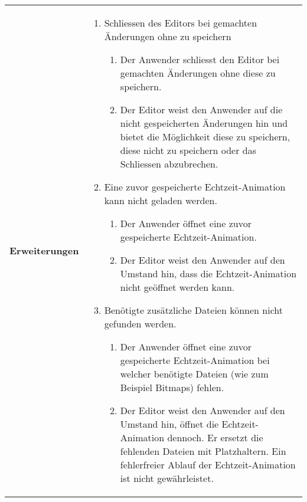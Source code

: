 \begin{longtabu}{p{0.5\textwidth}p{0.5\textwidth}}
    \cmidrule(r){1-1}\cmidrule(lr){2-2}
        \textbf{Erweiterungen} &
        \begin{enumerate}[label= (\alph*)]
            \item{Schliessen des Editors bei gemachten Änderungen ohne zu
                    speichern
                \begin{enumerate}[label= (\roman*)]
                    \item{Der Anwender schliesst den Editor bei gemachten
                            Änderungen ohne diese zu speichern.}
                    \item{Der Editor weist den Anwender auf die
                            nicht gespeicherten Änderungen hin und bietet
                            die Möglichkeit diese zu speichern, diese nicht
                            zu speichern oder das Schliessen abzubrechen.}
                \end{enumerate}
            }
            \item{Eine zuvor gespeicherte Echtzeit-Animation kann nicht
                    geladen werden.
                \begin{enumerate}[label= (\roman*)]
                    \item{Der Anwender öffnet eine zuvor gespeicherte
                            Echtzeit-Animation.}
                    \item{Der Editor weist den Anwender auf den Umstand
                            hin, dass die Echtzeit-Animation nicht geöffnet
                            werden kann.}
                \end{enumerate}
            }
            \item{Benötigte zusätzliche Dateien können nicht gefunden
                    werden.
                \begin{enumerate}[label= (\roman*)]
                    \item{Der Anwender öffnet eine zuvor gespeicherte
                            Echtzeit-Animation bei welcher benötigte
                            Dateien (wie zum Beispiel Bitmaps) fehlen.}
                    \item{Der Editor weist den Anwender auf den Umstand
                            hin, öffnet die Echtzeit-Animation dennoch. Er
                            ersetzt die fehlenden Dateien mit
                            Platzhaltern. Ein fehlerfreier Ablauf der
                            Echtzeit-Animation ist nicht gewährleistet.}
                \end{enumerate}
}
\end{enumerate}
\end{longtabu}
